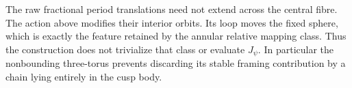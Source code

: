 \begin{remark}[Scope]
The raw fractional period translations need not extend across
the central fibre. The action above modifies their interior
orbits. Its loop moves the fixed sphere, which is exactly the
feature retained by the annular relative mapping class. Thus
the construction does not trivialize that class or evaluate
$J_\psi$. In particular the nonbounding three-torus prevents
discarding its stable framing contribution by a chain lying
entirely in the cusp body.
\end{remark}
